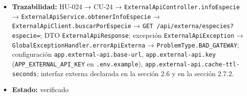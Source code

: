 \documentclass[
  spanish,
]{article}
\begin{document}
\begin{itemize}
  \texttt{cache\allowbreak{}Miss\allowbreak{}Sin\allowbreak{}Taxonomia\allowbreak{}Ni\allowbreak{}Caracteristicas\allowbreak{}Devuelve\allowbreak{}Campos\allowbreak{}Nulos}
  (criterio 2), \texttt{cache\allowbreak{}Miss\allowbreak{}Con\allowbreak{}Resultados\allowbreak{}Vacios\allowbreak{}Lanza\allowbreak{}Excepcion}
  (criterio 3), \texttt{falla\allowbreak{}Al\allowbreak{}Escribir\allowbreak{}En\allowbreak{}Redis\allowbreak{}No\allowbreak{}Rompe\allowbreak{}La\allowbreak{}Respuesta}
  (criterio 4), \texttt{cache\allowbreak{}Con\allowbreak{}Json\allowbreak{}Corrupto\allowbreak{}Lanza\allowbreak{}Excepcion} (criterio
  5). Criterio 6: inspección de
  \texttt{External\allowbreak{}Api\allowbreak{}Client.\allowbreak{}buscar\allowbreak{}Por\allowbreak{}Especie}, cuya URL se compone
  únicamente con \texttt{query\allowbreak{}Param("name",\allowbreak{}\ especie)} y cuya cabecera
  es \texttt{X-\allowbreak{}Api-\allowbreak{}Key}. Medición empírica adicional en
  \texttt{docs/\allowbreak{}u4/\allowbreak{}evidencias/\allowbreak{}fred/\allowbreak{}redis-\allowbreak{}cache-\allowbreak{}comparacion.\allowbreak{}md}
  (comparación real de tiempos de respuesta con caché fría vs.~caché
  caliente).
\item
  \textbf{Trazabilidad:} HU-024 → CU-24 →
  \texttt{External\allowbreak{}Api\allowbreak{}Controller.\allowbreak{}info\allowbreak{}Especie} →
  \texttt{External\allowbreak{}Api\allowbreak{}Service.\allowbreak{}obtener\allowbreak{}Info\allowbreak{}Especie} →
  \texttt{External\allowbreak{}Api\allowbreak{}Client.\allowbreak{}buscar\allowbreak{}Por\allowbreak{}Especie} →
  \texttt{GET\ /\allowbreak{}api/\allowbreak{}externa/\allowbreak{}especies?especie=}; DTO
  \texttt{External\allowbreak{}Api\allowbreak{}Response}; excepción \texttt{External\allowbreak{}Api\allowbreak{}Exception}
  → \texttt{Global\allowbreak{}Exception\allowbreak{}Handler.\allowbreak{}error\allowbreak{}Api\allowbreak{}Externa} →
  \texttt{Problem\allowbreak{}Type.\allowbreak{}BAD\_\allowbreak{}GATEWAY}; configuración
  \texttt{app.\allowbreak{}external-\allowbreak{}api.\allowbreak{}base-\allowbreak{}url}, \texttt{app.\allowbreak{}external-\allowbreak{}api.\allowbreak{}key}
  (\texttt{APP\_\allowbreak{}EXTERNAL\_\allowbreak{}API\_\allowbreak{}KE\allowbreak{}Y} en \texttt{.\allowbreak{}env.\allowbreak{}example}),
  \texttt{app.\allowbreak{}external-\allowbreak{}api.\allowbreak{}cache-\allowbreak{}ttl-\allowbreak{}seconds}; interfaz externa
  declarada en la sección 2.6 y en la sección 2.7.2.
\item
  \textbf{Estado:} verificado
\end{itemize}
\end{document}
